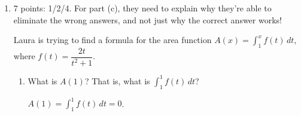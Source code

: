 \documentclass{article}
\begin{document}
\begin{enumerate}[topsep=0pt]
\begin{enumerate}

  \end{enumerate}

\item 

\begin{grading}
7 points: 1/2/4. For part (c), they need to explain why they're able to eliminate the wrong answers, and not just why the correct answer works!
\end{grading}

    Laura is trying to find a formula for the area function 
    $A(x)=\displaystyle\int_1^x f(t)\,dt$,
    where $f(t) = \dfrac{2t}{t^2 + 1}$.

  \begin{enumerate}[topsep=0pt]
  \item
    \begin{problem}[\vfill]
      What is $A(1)$? That is, what is 
      $\displaystyle\int_1^1 f(t)\,dt$? 
    \end{problem}

    \begin{solution}
      $\displaystyle A(1) = \int_1^1 f(t)\,dt = \boxed{0}$. 
    \end{solution}


\end{enumerate}
\end{enumerate}
\end{document}
